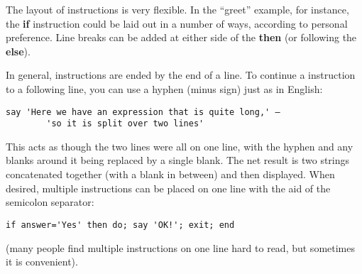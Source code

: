 The layout of instructions is very flexible. In the “greet” example,
for instance, the \textbf{if} instruction could be laid out in a number of
ways, according to personal preference. Line breaks can be added at
either side of the \textbf{then} (or following the \textbf{else}).

In general, instructions are ended by the end of a line. To continue a
instruction to a following line, you can use a hyphen (minus sign)
just as in English:
\begin{lstlisting}[label=continue,caption=Continuation]
    say 'Here we have an expression that is quite long,' –
        'so it is split over two lines'
\end{lstlisting}
This acts as though the two lines were all on one line, with the hyphen and any blanks around it being replaced by a single blank. The net result is two strings concatenated together (with a blank in between) and then displayed.
When desired, multiple instructions can be placed on one line with the
aid of the semicolon separator:
\begin{lstlisting}[label=multiple,caption=Multiple Instructions]
    if answer='Yes' then do; say 'OK!'; exit; end
\end{lstlisting}
(many people find multiple instructions on one line hard to read, but sometimes it is convenient).
